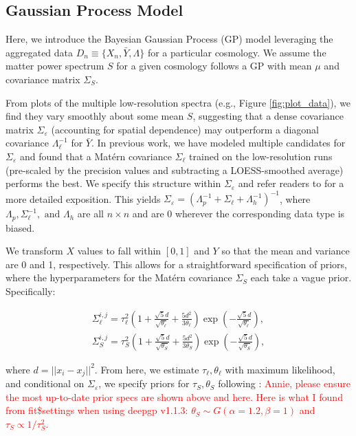 \documentclass[11pt]{article}
\begin{document}
\subsection{Gaussian Process Model}

Here, we introduce the Bayesian Gaussian Process (GP) model leveraging the aggregated 
data $D_n \equiv \{X_n, \bar Y, \Lambda\}$ for a particular cosmology. We assume 
the matter power spectrum $S$ for a given cosmology follows a GP with mean $\mu$ 
and covariance matrix $\Sigma_S$.

From plots of the multiple low-resolution spectra (e.g., Figure \ref{fig:plot_data}), 
we find they vary smoothly about some mean $S$, suggesting that a dense covariance 
matrix $\Sigma_\varepsilon$ (accounting for spatial dependence) may outperform a 
diagonal covariance $\Lambda_\ell^{-1}$ for $\bar Y$. In previous work, we have 
modeled multiple candidates for $\Sigma_\varepsilon$ \citep{walsh2023bayesian} and 
found that a Mat\'ern covariance $\Sigma_\ell$ trained on the low-resolution runs 
(pre-scaled by the precision values and subtracting a LOESS-smoothed average) performs 
the best. We specify this structure within $\Sigma_\varepsilon$ and refer readers 
to \cite{walsh2023bayesian} for a more detailed exposition. This yields 
$\Sigma_\varepsilon=\left(\Lambda_p^{-1} + \Sigma_\ell + \Lambda_h^{-1}\right)^{-1}$, 
where $\Lambda_p, \Sigma_\ell^{-1}, \text{ and } \Lambda_h$ are all $n\times n$ 
and are 0 wherever the corresponding data type is biased.

We transform $X$ values to fall within $[0,1]$ and $Y$ so that the mean and variance 
are 0 and 1, respectively. This allows for a straightforward specification of priors, 
where the hyperparameters for the Mat\'ern covariance $\Sigma_S$ each take a vague prior. 
Specifically:

\begin{align}
\Sigma_\ell^{i,j} = \tau_\ell^2  \left( 1 + \frac{\sqrt{5}d}{\sqrt{\theta_\ell}} + 
  \frac{5d^2}{3\theta_\ell}\right) \exp\left(-\frac{\sqrt{5}d}{\sqrt{\theta_\ell}}\right),\\
\Sigma_S^{i,j} = \tau_S^2  \left( 1 + \frac{\sqrt{5}d}{\sqrt{\theta_S}} + 
  \frac{5d^2}{3\theta_S}\right) \exp\left(-\frac{\sqrt{5}d}{\sqrt{\theta_S}}\right),
\end{align}

where $d=||x_i-x_j||^2$. From here, we estimate $\tau_\ell, \theta_\ell$ with maximum 
likelihood, and conditional on $\Sigma_\varepsilon$, we specify priors for $\tau_S, \theta_S$ 
following \cite{sauer2023active}: \textcolor{red}{Annie, please ensure the most up-to-date 
prior specs are shown above and here. Here is what I found from fit\$settings when using 
deepgp v1.1.3: $\theta_S \sim G(\alpha=1.2, \beta=1)$ and $\tau_S \propto 1/\tau_S^2$.}
\end{document}
